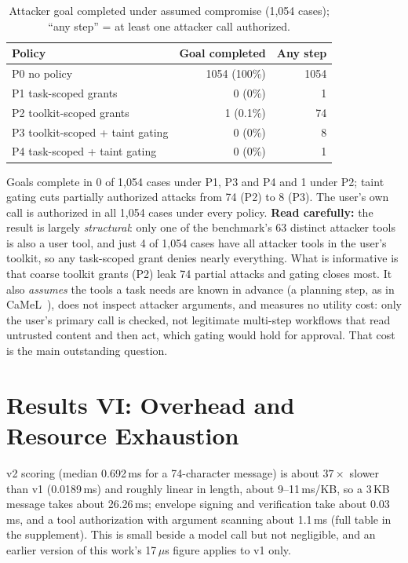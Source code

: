 \documentclass[conference]{IEEEtran}
\newcommand{\ourfirst}{an earlier version of this work}
\newcommand{\ourfirst}{our first manuscript}
\begin{document}
\begin{table}[t]
\centering
\caption{Attacker goal completed under assumed compromise (1{,}054 cases); ``any step''
= at least one attacker call authorized.}
\label{tab:policy}
\footnotesize
\setlength{\tabcolsep}{3pt}
\begin{tabular}{@{}lrr@{}}
\toprule
\textbf{Policy} & \textbf{Goal completed} & \textbf{Any step} \\
\midrule
P0 no policy                         & 1054 (100\%) & 1054 \\
P1 task-scoped grants                &    0 (0\%)    &    1 \\
P2 toolkit-scoped grants             &    1 (0.1\%)  &   74 \\
P3 toolkit-scoped + taint gating     &    0 (0\%)    &    8 \\
P4 task-scoped + taint gating        &    0 (0\%)    &    1 \\
\bottomrule
\end{tabular}
\end{table}

Goals complete in 0 of 1{,}054 cases under P1, P3 and P4 and 1 under P2; taint gating
cuts partially authorized attacks from 74 (P2) to 8 (P3). The user's own call is
authorized in all 1{,}054 cases under every policy. \textbf{Read carefully:} the result is
largely \emph{structural}: only one of the benchmark's 63 distinct attacker tools is also
a user tool, and just 4 of 1{,}054 cases have all attacker tools in the user's toolkit,
so any task-scoped grant denies nearly everything. What is informative is that coarse
toolkit grants (P2) leak 74 partial attacks and gating closes most. It also
\emph{assumes} the tools a task needs are known in advance (a planning step, as in
CaMeL~\cite{debenedetti2025camel}), does not inspect attacker arguments, and measures no
utility cost: only the user's primary call is checked, not legitimate multi-step
workflows that read untrusted content and then act, which gating would hold for
approval. That cost is the main outstanding question.

\section{Results VI: Overhead and Resource Exhaustion}
\label{sec:dos}

v2 scoring (median 0.692\,ms for a 74-character message) is about $37\times$ slower than
v1 (0.0189\,ms) and roughly linear in length, about 9--11\,ms/KB, so a 3\,KB message
takes about 26.26\,ms; envelope signing and verification take about 0.03\,ms, and a tool
authorization with argument scanning about 1.1\,ms (full table in the supplement). This
is small beside a model call but not negligible, and \ourfirst{}'s 17\,$\mu$s figure
applies to v1 only.
\end{document}
